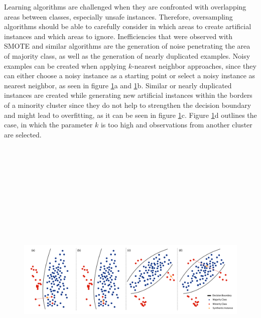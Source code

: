 \documentclass[parskip=full]{scrartcl}
\begin{document}
Learning algorithms are challenged when they are confronted with overlapping areas between classes, especially unsafe instances. Therefore, oversampling algorithms should be able to carefully consider in which areas to create artificial instances and which areas to ignore. Inefficiencies that were observed with SMOTE and similar algorithms are the generation of noise penetrating the area of majority class, as well as the generation of nearly duplicated examples. Noisy examples can be created when applying $k$-nearest neighbor approaches, since they can either choose a noisy instance as a starting point or select a noisy instance as nearest neighbor, as seen in figure \ref{fig:Douzas}a and \ref{fig:Douzas}b. Similar or nearly duplicated instances are created while generating new artificial instances within the borders of a minority cluster since they do not help to strengthen the decision boundary and might lead to overfitting, as it can be seen in figure \ref{fig:Douzas}c. Figure \ref{fig:Douzas}d outlines the case, in which the parameter $k$ is too high and observations from another cluster are selected.

\begin{figure}[H]
	\centering
	\includegraphics[width=16.5cm, height=14cm, keepaspectratio]{../analysis/fig3.png}
	\label{fig:Douzas}
\end{figure}
\end{document}
